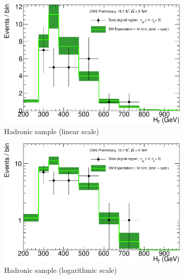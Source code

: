 \clearpage
\begin{figure}[h!]
  \centering
  \begin{subfigure}[b]{0.48\textwidth}
    \includegraphics[width=\textwidth]
    {Figs/results/v0/greenBand/single_plots/hadronic_3b_ge4j.pdf}
    \caption{Hadronic sample (linear scale)}
  \end{subfigure}
  \vspace{0.7cm}\begin{subfigure}[b]{0.48\textwidth}
    \includegraphics[width=\textwidth]
    {Figs/results/v0/greenBand/single_plots/hadronic_3b_ge4j_logy.pdf}
    \caption{Hadronic sample (logarithmic scale)}
  \end{subfigure}
  \begin{subfigure}[b]{0.48\textwidth}

\end{subfigure}
\end{figure}
